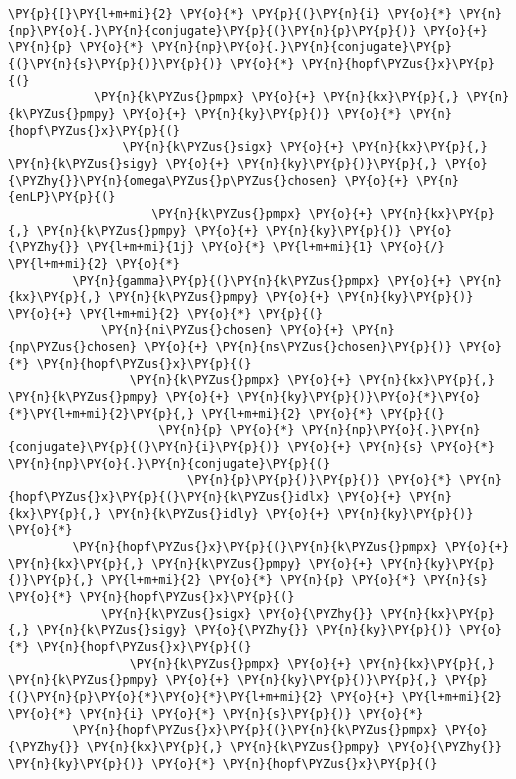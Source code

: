 \begin{Verbatim}[commandchars=\\\{\}]
        \PY{p}{[}\PY{l+m+mi}{2} \PY{o}{*} \PY{p}{(}\PY{n}{i} \PY{o}{*} \PY{n}{np}\PY{o}{.}\PY{n}{conjugate}\PY{p}{(}\PY{n}{p}\PY{p}{)} \PY{o}{+} \PY{n}{p} \PY{o}{*} \PY{n}{np}\PY{o}{.}\PY{n}{conjugate}\PY{p}{(}\PY{n}{s}\PY{p}{)}\PY{p}{)} \PY{o}{*} \PY{n}{hopf\PYZus{}x}\PY{p}{(}
            \PY{n}{k\PYZus{}pmpx} \PY{o}{+} \PY{n}{kx}\PY{p}{,} \PY{n}{k\PYZus{}pmpy} \PY{o}{+} \PY{n}{ky}\PY{p}{)} \PY{o}{*} \PY{n}{hopf\PYZus{}x}\PY{p}{(}
                \PY{n}{k\PYZus{}sigx} \PY{o}{+} \PY{n}{kx}\PY{p}{,} \PY{n}{k\PYZus{}sigy} \PY{o}{+} \PY{n}{ky}\PY{p}{)}\PY{p}{,} \PY{o}{\PYZhy{}}\PY{n}{omega\PYZus{}p\PYZus{}chosen} \PY{o}{+} \PY{n}{enLP}\PY{p}{(}
                    \PY{n}{k\PYZus{}pmpx} \PY{o}{+} \PY{n}{kx}\PY{p}{,} \PY{n}{k\PYZus{}pmpy} \PY{o}{+} \PY{n}{ky}\PY{p}{)} \PY{o}{\PYZhy{}} \PY{l+m+mi}{1j} \PY{o}{*} \PY{l+m+mi}{1} \PY{o}{/} \PY{l+m+mi}{2} \PY{o}{*}
         \PY{n}{gamma}\PY{p}{(}\PY{n}{k\PYZus{}pmpx} \PY{o}{+} \PY{n}{kx}\PY{p}{,} \PY{n}{k\PYZus{}pmpy} \PY{o}{+} \PY{n}{ky}\PY{p}{)} \PY{o}{+} \PY{l+m+mi}{2} \PY{o}{*} \PY{p}{(}
             \PY{n}{ni\PYZus{}chosen} \PY{o}{+} \PY{n}{np\PYZus{}chosen} \PY{o}{+} \PY{n}{ns\PYZus{}chosen}\PY{p}{)} \PY{o}{*} \PY{n}{hopf\PYZus{}x}\PY{p}{(}
                 \PY{n}{k\PYZus{}pmpx} \PY{o}{+} \PY{n}{kx}\PY{p}{,} \PY{n}{k\PYZus{}pmpy} \PY{o}{+} \PY{n}{ky}\PY{p}{)}\PY{o}{*}\PY{o}{*}\PY{l+m+mi}{2}\PY{p}{,} \PY{l+m+mi}{2} \PY{o}{*} \PY{p}{(}
                     \PY{n}{p} \PY{o}{*} \PY{n}{np}\PY{o}{.}\PY{n}{conjugate}\PY{p}{(}\PY{n}{i}\PY{p}{)} \PY{o}{+} \PY{n}{s} \PY{o}{*} \PY{n}{np}\PY{o}{.}\PY{n}{conjugate}\PY{p}{(}
                         \PY{n}{p}\PY{p}{)}\PY{p}{)} \PY{o}{*} \PY{n}{hopf\PYZus{}x}\PY{p}{(}\PY{n}{k\PYZus{}idlx} \PY{o}{+} \PY{n}{kx}\PY{p}{,} \PY{n}{k\PYZus{}idly} \PY{o}{+} \PY{n}{ky}\PY{p}{)} \PY{o}{*}
         \PY{n}{hopf\PYZus{}x}\PY{p}{(}\PY{n}{k\PYZus{}pmpx} \PY{o}{+} \PY{n}{kx}\PY{p}{,} \PY{n}{k\PYZus{}pmpy} \PY{o}{+} \PY{n}{ky}\PY{p}{)}\PY{p}{,} \PY{l+m+mi}{2} \PY{o}{*} \PY{n}{p} \PY{o}{*} \PY{n}{s} \PY{o}{*} \PY{n}{hopf\PYZus{}x}\PY{p}{(}
             \PY{n}{k\PYZus{}sigx} \PY{o}{\PYZhy{}} \PY{n}{kx}\PY{p}{,} \PY{n}{k\PYZus{}sigy} \PY{o}{\PYZhy{}} \PY{n}{ky}\PY{p}{)} \PY{o}{*} \PY{n}{hopf\PYZus{}x}\PY{p}{(}
                 \PY{n}{k\PYZus{}pmpx} \PY{o}{+} \PY{n}{kx}\PY{p}{,} \PY{n}{k\PYZus{}pmpy} \PY{o}{+} \PY{n}{ky}\PY{p}{)}\PY{p}{,} \PY{p}{(}\PY{n}{p}\PY{o}{*}\PY{o}{*}\PY{l+m+mi}{2} \PY{o}{+} \PY{l+m+mi}{2} \PY{o}{*} \PY{n}{i} \PY{o}{*} \PY{n}{s}\PY{p}{)} \PY{o}{*}
         \PY{n}{hopf\PYZus{}x}\PY{p}{(}\PY{n}{k\PYZus{}pmpx} \PY{o}{\PYZhy{}} \PY{n}{kx}\PY{p}{,} \PY{n}{k\PYZus{}pmpy} \PY{o}{\PYZhy{}} \PY{n}{ky}\PY{p}{)} \PY{o}{*} \PY{n}{hopf\PYZus{}x}\PY{p}{(}

\end{Verbatim}
